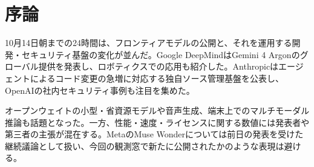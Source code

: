 \section*{序論}
10月14日朝までの24時間は、フロンティアモデルの公開と、それを運用する開発・セキュリティ基盤の変化が並んだ。Google DeepMindはGemini 4 Argonのグローバル提供を発表し、ロボティクスでの応用も紹介した。Anthropicはエージェントによるコード変更の急増に対応する独自ソース管理基盤を公表し、OpenAIの社内セキュリティ事例も注目を集めた。

オープンウェイトの小型・省資源モデルや音声生成、端末上でのマルチモーダル推論も話題となった。一方、性能・速度・ライセンスに関する数値には発表者や第三者の主張が混在する。MetaのMuse Wonderについては前日の発表を受けた継続議論として扱い、今回の観測窓で新たに公開されたかのような表現は避ける。
